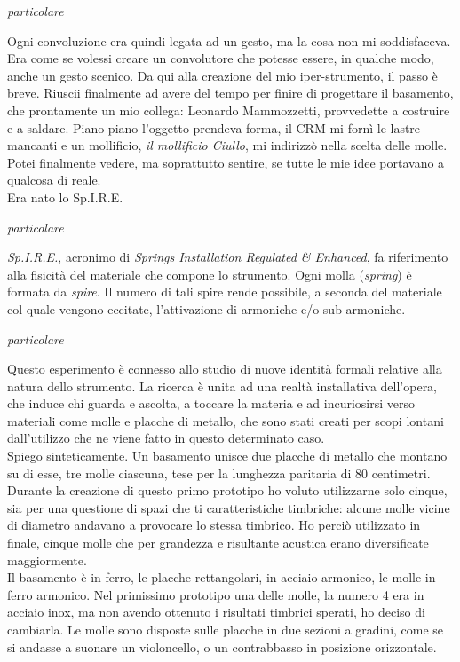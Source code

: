 \begin{floatingfigure}{10cm}
\mbox{}
\small{\caption{\textit{particolare}}}
\end{floatingfigure}
Ogni convoluzione era quindi legata ad un gesto, ma la cosa non mi soddisfaceva. Era come se volessi creare un convolutore che potesse essere, in qualche modo, anche un gesto scenico. Da qui alla creazione del mio iper-strumento, il passo è breve. Riuscii finalmente ad avere del tempo per finire di progettare il basamento, che prontamente un mio collega: Leonardo Mammozzetti, provvedette a costruire e a saldare. Piano piano l'oggetto prendeva forma, il CRM mi fornì le lastre mancanti e un mollificio, \textit{il mollificio Ciullo}, mi indirizzò nella scelta delle molle. Potei finalmente vedere, ma soprattutto sentire, se tutte le mie idee portavano a qualcosa di reale. \\
Era nato lo Sp.I.R.E. \\
\begin{floatingfigure}{10cm}
\mbox{}
\small{\caption{\textit{particolare}}}
\end{floatingfigure}
\textit{Sp.I.R.E.}, acronimo di \textit{Springs Installation Regulated \& Enhanced}, fa riferimento alla fisicità del materiale che compone lo strumento. Ogni molla (\textit{spring}) è formata da \textit{spire}. Il numero di tali spire rende possibile, a seconda del materiale col quale vengono eccitate, l'attivazione di armoniche e/o sub-armoniche. \\
\begin{floatingfigure}{10cm}
\mbox{}
\small{\caption{\textit{particolare}}}
\end{floatingfigure}
Questo esperimento è connesso allo studio di nuove identità formali relative alla natura dello strumento.  La ricerca è unita ad una realtà installativa dell'opera, che induce chi guarda e ascolta, a toccare la materia e ad incuriosirsi verso materiali come molle e placche di metallo, che sono stati creati per scopi lontani dall'utilizzo che ne viene fatto in questo determinato caso. \\
Spiego sinteticamente. Un basamento unisce due placche di metallo che montano su di esse, tre molle ciascuna, tese per la lunghezza paritaria di 80 centimetri. Durante la creazione di questo primo prototipo ho voluto utilizzarne solo cinque, sia per una questione di spazi che ti caratteristiche timbriche: alcune molle vicine di diametro andavano a provocare lo stessa timbrico. Ho perciò utilizzato in finale, cinque molle che per grandezza e risultante acustica erano diversificate maggiormente.\\ Il basamento è in ferro, le placche rettangolari, in acciaio armonico, le molle in ferro armonico. Nel primissimo prototipo una delle molle, la numero 4 era in acciaio inox, ma non avendo ottenuto i risultati timbrici sperati, ho deciso di cambiarla. Le molle sono disposte sulle placche in due sezioni a gradini, come se si andasse a suonare un violoncello, o un contrabbasso in posizione orizzontale. \\
